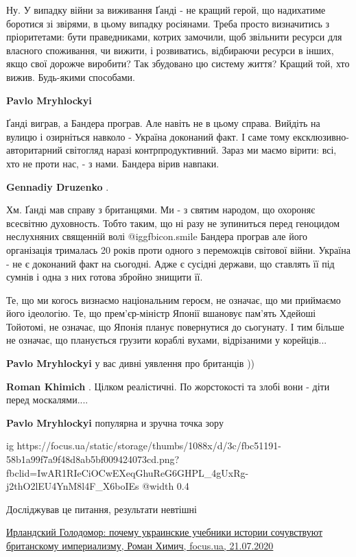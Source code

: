 \begin{itemize}
Ну. У випадку війни за виживання Ґанді - не кращий герой, що надихатиме
боротися зі звірями, в цьому випадку росіянами. Треба просто визначитись з
пріоритетами: бути праведниками, котрих замочили, щоб звільнити ресурси для
власного споживання, чи вижити, і розвиватись, відбираючи ресурси в інших, якщо
свої дорожче виробити? Так збудовано цю систему життя? Кращий той, хто вижив.
Будь-якими способами.

\begin{itemize} %
\textbf{Pavlo Mryhlockyi} 

Ґанді виграв, а Бандера програв. Але навіть не в цьому справа. Вийдіть на
вулицю і озирніться навколо - Україна доконаний факт. І саме тому
ексклюзивно-авторитарний світогляд наразі контрпродуктивний. Зараз ми маємо
вірити: всі, хто не проти нас, - з нами. Бандера вірив навпаки.

\textbf{Gennadiy Druzenko} . 

Хм. Ґанді мав справу з британцями. Ми - з святим народом, що охороняє всесвітню
духовность. Тобто таким, що ні разу не зупиниться перед геноцидом неслухняних
священній волі  @igg{fbicon.smile}  Бандера програв але його організація
трималась 20 років проти одного з переможців світової війни. Україна - не є
доконаний факт на сьогодні.  Адже є сусідні держави, що ставлять її під сумнів
і одна з них готова збройно знищити її.

Те, що ми когось визнаємо національним героєм, не означає, що ми приймаємо його
ідеологію. Те, що прем'єр-міністр Японії вшановує пам'ять Хдейоші Тойотомі, не
означає, що Японія планує повернутися до сьогунату. І тим більше не означає, що
планується грузити кораблі вухами, відрізаними у корейців...

\textbf{Pavlo Mryhlockyi} у вас дивні уявлення про британців ))

\textbf{Roman Khimich} . Цілком реалістичні. По жорстокості та злобі вони - діти перед москалями....

\textbf{Pavlo Mryhlockyi} популярна и зручна точка зору

\ifcmt
  ig https://focus.ua/static/storage/thumbs/1088x/d/3c/fbc51191-58b1a99f7a9f48d8ab5bf009424073cd.png?fbclid=IwAR1RIeCiOCwEXeqGhuReG6GHPL_4gUxRg-j2thO2lEU4YnM8l4F_X6boIEs
  @width 0.4
\fi

Досліджував це питання, результати невтішні

\href{https://focus.ua/opinion/opinions/459279-irlandskii_golodomor_pochemu_ukrainskie_uchebniki_istorii_sochuvstvuiut_britanskomu_imperializmu}{%
Ирландский Голодомор: почему украинские учебники истории сочувствуют британскому империализму, %
Роман Химич, focus.ua, 21.07.2020%
}


\end{itemize}
\end{itemize}
